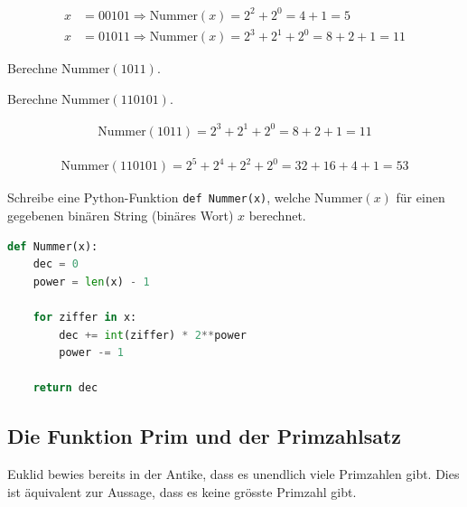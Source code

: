 \begin{myexample}
\begin{align*}
	x & = 00101 \Rightarrow \text{Nummer}(x) = 2^2 + 2^0 = 4 + 1 = 5            \\
	x & = 01011 \Rightarrow \text{Nummer}(x) = 2^3 + 2^1  + 2^0 = 8+ 2 + 1 = 11
\end{align*}
\end{myexample}

\begin{myexercise}
	\begin{aenum}
		\item Berechne $\text{Nummer}(1011)$.
		\item Berechne $\text{Nummer}(110101)$.
	\end{aenum}
	\begin{myanswer}
		\begin{aenum}
			\item \begin{align*}
				\text{Nummer}(1011) = 2^3 + 2^1 + 2^0 = 8 + 2 + 1 = 11
			\end{align*}
			\item \begin{align*}
				\text{Nummer}(110101) = 2^5 + 2^4 + 2^2 + 2^0 = 32 + 16 + 4 + 1 = 53
			\end{align*}
		\end{aenum}
	\end{myanswer}
\end{myexercise}


\begin{mychallenge}
	Schreibe eine Python-Funktion \lstinline|def Nummer(x)|, welche $\text{Nummer}(x)$ für einen gegebenen binären String (binäres Wort) $x$ berechnet.
	\begin{myanswer}
		\begin{lstlisting}[language=Python,caption=Nummer,numbers=none]
def Nummer(x):
    dec = 0
    power = len(x) - 1

    for ziffer in x:
        dec += int(ziffer) * 2**power
        power -= 1

    return dec
\end{lstlisting}
	\end{myanswer}
\end{mychallenge}

\subsection{Die Funktion Prim und der Primzahlsatz}
Euklid bewies bereits in der Antike, dass es unendlich viele Primzahlen gibt.
Dies ist äquivalent zur Aussage, dass es keine grösste Primzahl gibt.

